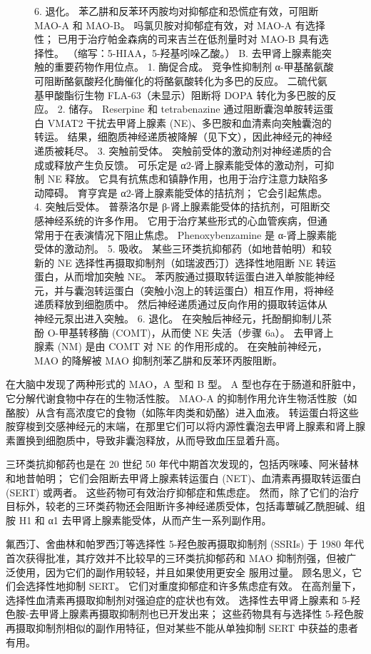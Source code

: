 \begin{figure}[htbp]
{	6. 退化。 苯乙肼和反苯环丙胺均对抑郁症和恐慌症有效，可阻断 MAO-A 和 MAO-B。 吗氯贝胺对抑郁症有效，对 MAO-A 有选择性； 已用于治疗帕金森病的司来吉兰在低剂量时对 MAO-B 具有选择性。 （缩写：5-HIAA，5-羟基吲哚乙酸。） B. 去甲肾上腺素能突触的重要药物作用位点。 1. 酶促合成。 竞争性抑制剂 α-甲基酪氨酸可阻断酪氨酸羟化酶催化的将酪氨酸转化为多巴的反应。 二硫代氨基甲酸酯衍生物 FLA-63（未显示）阻断将 DOPA 转化为多巴胺的反应。 2. 储存。 Reserpine 和 tetrabenazine 通过阻断囊泡单胺转运蛋白 VMAT2 干扰去甲肾上腺素 (NE)、多巴胺和血清素向突触囊泡的转运。 结果，细胞质神经递质被降解（见下文），因此神经元的神经递质被耗尽。 3. 突触前受体。 突触前受体的激动剂对神经递质的合成或释放产生负反馈。 可乐定是 α2-肾上腺素能受体的激动剂，可抑制 NE 释放。 它具有抗焦虑和镇静作用，也用于治疗注意力缺陷多动障碍。 育亨宾是 α2-肾上腺素能受体的拮抗剂； 它会引起焦虑。 4. 突触后受体。 普萘洛尔是 β-肾上腺素能受体的拮抗剂，可阻断交感神经系统的许多作用。 它用于治疗某些形式的心血管疾病，但通常用于在表演情况下阻止焦虑。 Phenoxybenzamine 是 α-肾上腺素能受体的激动剂。 5. 吸收。 某些三环类抗抑郁药（如地昔帕明）和较新的 NE 选择性再摄取抑制剂（如瑞波西汀）选择性地阻断 NE 转运蛋白，从而增加突触 NE。 苯丙胺通过摄取转运蛋白进入单胺能神经元，并与囊泡转运蛋白（突触小泡上的转运蛋白）相互作用，将神经递质释放到细胞质中。 然后神经递质通过反向作用的摄取转运体从神经元泵出进入突触。 6. 退化。 在突触后神经元，托酚酮抑制儿茶酚 O-甲基转移酶 (COMT)，从而使 NE 失活（步骤 6a）。 去甲肾上腺素 (NM) 是由 COMT 对 NE 的作用形成的。 在突触前神经元，MAO 的降解被 MAO 抑制剂苯乙肼和反苯环丙胺阻断。}
	\label{fig:61_7}
\end{figure}

在大脑中发现了两种形式的 MAO，A 型和 B 型。 A 型也存在于肠道和肝脏中，它分解代谢食物中存在的生物活性胺。 MAO-A 的抑制作用允许生物活性胺（如酪胺）从含有高浓度它的食物（如陈年肉类和奶酪）进入血液。 转运蛋白将这些胺穿梭到交感神经元的末端，在那里它们可以将内源性囊泡去甲肾上腺素和肾上腺素置换到细胞质中，导致非囊泡释放，从而导致血压显着升高。

三环类抗抑郁药也是在 20 世纪 50 年代中期首次发现的，包括丙咪嗪、阿米替林和地昔帕明； 它们会阻断去甲肾上腺素转运蛋白 (NET)、血清素再摄取转运蛋白 (SERT) 或两者。 这些药物可有效治疗抑郁症和焦虑症。 然而，除了它们的治疗目标外，较老的三环类药物还会阻断许多神经递质受体，包括毒蕈碱乙酰胆碱、组胺 H1 和 α1 去甲肾上腺素能受体，从而产生一系列副作用。

氟西汀、舍曲林和帕罗西汀等选择性 5-羟色胺再摄取抑制剂 (SSRIs) 于 1980 年代首次获得批准，其疗效并不比较早的三环类抗抑郁药和 MAO 抑制剂强，但被广泛使用，因为它们的副作用较轻，并且如果使用更安全 服用过量。 顾名思义，它们会选择性地抑制 SERT。 它们对重度抑郁症和许多焦虑症有效。 在高剂量下，选择性血清素再摄取抑制剂对强迫症的症状也有效。 选择性去甲肾上腺素和 5-羟色胺-去甲肾上腺素再摄取抑制剂也已开发出来； 这些药物具有与选择性 5-羟色胺再摄取抑制剂相似的副作用特征，但对某些不能从单独抑制 SERT 中获益的患者有用。

